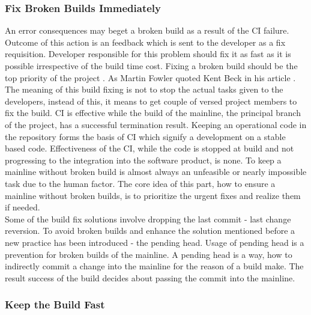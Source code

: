 \subsubsection{Fix Broken Builds Immediately}

An error consequences may beget a broken build as a result of the CI failure. Outcome of this action is an feedback which is sent to the developer as a fix requisition. Developer responsible for this problem should fix it as fast as it is possible irrespective of the build time cost. Fixing a broken build should be the top priority of the project \cite{CIQualityFramework}. As Martin Fowler quoted Kent Beck in his article  \cite{MartinFowler}. The meaning of this build fixing is not to stop the actual tasks given to the developers, instead of this, it means to get couple of versed project members to fix the build. CI is effective while the build of the mainline, the principal branch of the project, has a successful termination result. Keeping an operational code in the repository forms the basis of CI which signify a development on a stable based code. Effectiveness of the CI, while the code is stopped at build and not progressing to the integration into the software product, is none. To keep a mainline without broken build is almost always an unfeasible or nearly impossible task due to the human factor. The core idea of this part, how to ensure a mainline without broken builds, is to prioritize the urgent fixes and realize them if needed.\\

Some of the build fix solutions involve dropping the last commit - last change reversion. To avoid broken builds and enhance the solution mentioned before a new practice has been introduced - the pending head. Usage of pending head is a prevention for broken builds of the mainline. A pending head is a way, how to indirectly commit a change into the mainline for the reason of a build make. The result success of the build decides about passing the commit into the mainline.

\subsubsection{Keep the Build Fast}

